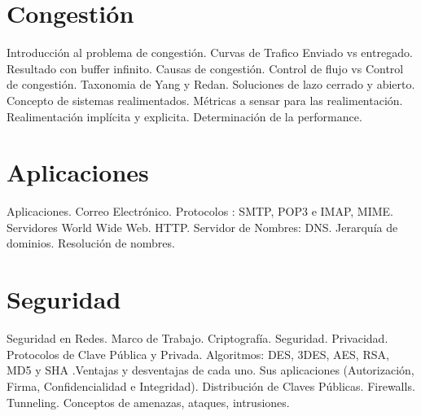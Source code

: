 \documentclass[10pt,a4paper]{article}
\begin{document}
{\section*{Congestión}
Introducción al problema de congestión. Curvas de Trafico Enviado vs entregado. Resultado con buffer infinito. Causas de congestión. Control de flujo vs Control de congestión. Taxonomia de Yang y Redan. Soluciones de lazo cerrado y abierto. Concepto de sistemas realimentados. Métricas a sensar para las realimentación. Realimentación implícita y explicita. Determinación de la performance.

\section{Aplicaciones}
Aplicaciones. Correo Electrónico. Protocolos : SMTP, POP3 e IMAP, MIME. Servidores World Wide Web. HTTP. Servidor de Nombres: DNS. Jerarquía de dominios. Resolución de nombres.

\section{Seguridad}
Seguridad en Redes. Marco de Trabajo. Criptografía. Seguridad. Privacidad. Protocolos de Clave Pública y Privada. Algoritmos: DES, 3DES, AES, RSA, MD5 y SHA .Ventajas y desventajas de cada uno. Sus aplicaciones (Autorización, Firma, Confidencialidad e Integridad). Distribución de Claves Públicas. Firewalls. Tunneling. Conceptos de amenazas, ataques, intrusiones.
}
\end{document}
